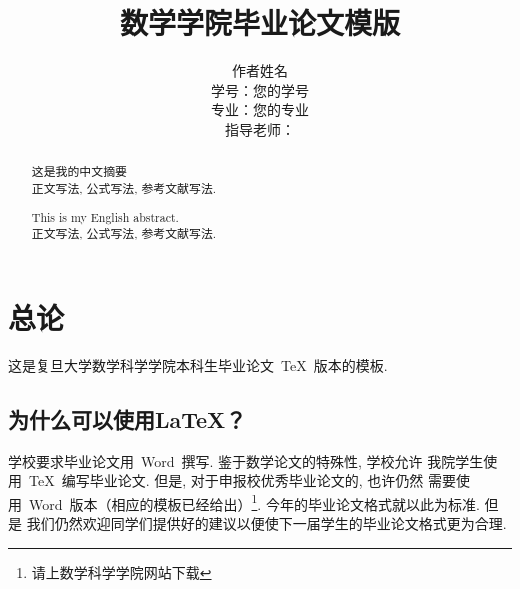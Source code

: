 \documentclass[notitlepage,cs4size,punct,oneside]{ctexrep}
\title{{\zihao{1}\heiti{} 数学学院毕业论文模版}}
\author{作者姓名\\学号：您的学号\\专业：您的专业\\指导老师：}
\date{}
\numberwithin{equation}{chapter}
\theoremstyle{mystyle}
\begin{document}
\CTEXoptions[abstractname={摘要：}]
\CTEXoptions[bibname={\heiti 参考文献}]

\renewcommand{\thepage}{\roman{page}}
\setcounter{page}{1}
\tableofcontents\clearpage

\maketitle\renewcommand{\thepage}{\arabic{page}}
\thispagestyle{empty}\setcounter{page}{0}
\renewcommand{\abstractname}{摘要}
\begin{abstract}
这是我的中文摘要\\
 正文写法, 公式写法, 参考文献写法.
\end{abstract}
\renewcommand{\abstractname}{Abstract}
\begin{abstract}
This is my English abstract.\\
 正文写法, 公式写法, 参考文献写法.
\end{abstract}


\chapter{总论}

这是复旦大学数学科学学院本科生毕业论文~\TeX ~版本的模板.

\section{为什么可以使用\LaTeX{}？}
学校要求毕业论文用~Word~撰写. 鉴于数学论文的特殊性, 学校允许
我院学生使用~\TeX~编写毕业论文. 但是, 对于申报校优秀毕业论文的,
也许仍然
需要使用~Word~版本（相应的模板已经给出）\footnote{请上数学科学学院网站下载}.
今年的毕业论文格式就以此为标准. 但是
我们仍然欢迎同学们提供好的建议以便使下一届学生的毕业论文格式更为合理.
\end{document}
